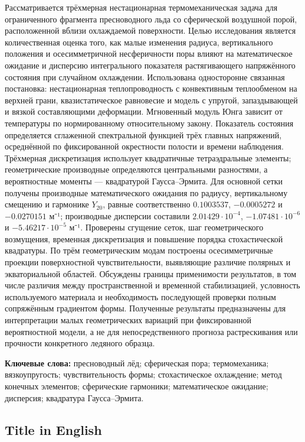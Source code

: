 \documentclass[
]{article}
\begin{document}
Рассматривается трёхмерная нестационарная термомеханическая задача для
ограниченного фрагмента пресноводного льда со сферической воздушной
порой, расположенной вблизи охлаждаемой поверхности. Целью исследования
является количественная оценка того, как малые изменения радиуса,
вертикального положения и осесимметричной несферичности поры влияют на
математическое ожидание и дисперсию интегрального показателя
растягивающего напряжённого состояния при случайном охлаждении.
Использована односторонне связанная постановка: нестационарная
теплопроводность с конвективным теплообменом на верхней грани,
квазистатическое равновесие и модель с упругой, запаздывающей и вязкой
составляющими деформации. Мгновенный модуль Юнга зависит от температуры
по нормированному относительному закону. Показатель состояния
определяется сглаженной спектральной функцией трёх главных напряжений,
осреднённой по фиксированной окрестности полости и времени наблюдения.
Трёхмерная дискретизация использует квадратичные тетраэдральные
элементы; геометрические производные определяются центральными
разностями, а вероятностные моменты --- квадратурой Гаусса--Эрмита. Для
основной сетки получены производные математического ожидания по радиусу,
вертикальному смещению и гармонике \(Y_{20}\), равные соответственно
\(0.1003537\), \(-0.0005272\) и \(-0.0270151\) м⁻¹; производные
дисперсии составили \(2.01429\cdot10^{-4}\), \(-1.07481\cdot10^{-6}\) и
\(-5.46217\cdot10^{-5}\) м⁻¹. Проверены сгущение сеток, шаг
геометрического возмущения, временная дискретизация и повышение порядка
стохастической квадратуры. По трём геометрическим модам построены
осесимметричные проекции поверхностной чувствительности, выявляющие
различие полярных и экваториальной областей. Обсуждены границы
применимости результатов, в том числе различия между пространственной и
временной стабилизацией, условность используемого материала и
необходимость последующей проверки полным сопряжённым градиентом формы.
Полученные результаты предназначены для интерпретации малых
геометрических вариаций при фиксированной вероятностной модели, а не для
непосредственного прогноза растрескивания или прочности конкретного
ледяного образца.

\textbf{Ключевые слова:} пресноводный лёд; сферическая пора;
термомеханика; вязкоупругость; чувствительность формы; стохастическое
охлаждение; метод конечных элементов; сферические гармоники;
математическое ожидание; дисперсия; квадратура Гаусса--Эрмита.

\subsection{Title in English}\label{title-in-english}
\end{document}
